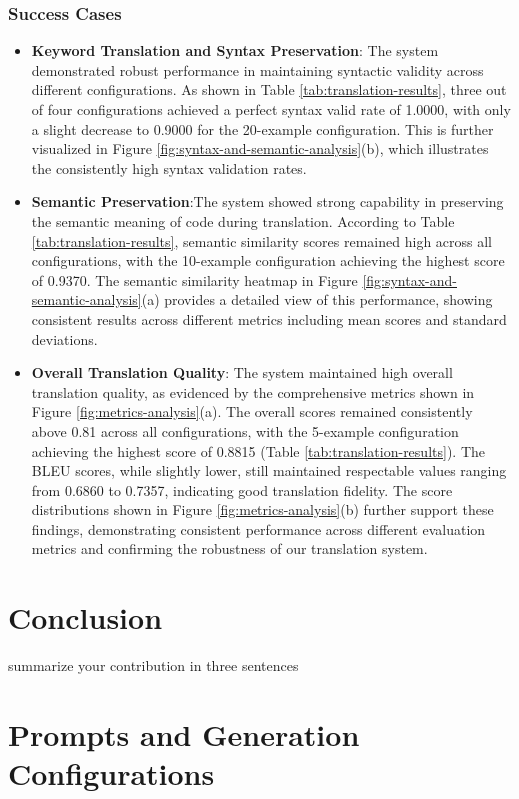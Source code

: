 \documentclass[11pt,a4paper]{article}
\begin{document}
\subsubsection{Success Cases}
\begin{itemize}[itemsep=0pt, topsep=0pt]
    \item \textbf{Keyword Translation and Syntax Preservation}: The system demonstrated robust performance in maintaining syntactic validity across different configurations. As shown in Table \ref{tab:translation-results}, three out of four configurations achieved a perfect syntax valid rate of 1.0000, with only a slight decrease to 0.9000 for the 20-example configuration. This is further visualized in Figure \ref{fig:syntax-and-semantic-analysis}(b), which illustrates the consistently high syntax validation rates.
    \item \textbf{Semantic Preservation}:The system showed strong capability in preserving the semantic meaning of code during translation. According to Table \ref{tab:translation-results}, semantic similarity scores remained high across all configurations, with the 10-example configuration achieving the highest score of 0.9370. The semantic similarity heatmap in Figure \ref{fig:syntax-and-semantic-analysis}(a) provides a detailed view of this performance, showing consistent results across different metrics including mean scores and standard deviations.
    \item \textbf{Overall Translation Quality}: The system maintained high overall translation quality, as evidenced by the comprehensive metrics shown in Figure \ref{fig:metrics-analysis}(a). The overall scores remained consistently above 0.81 across all configurations, with the 5-example configuration achieving the highest score of 0.8815 (Table \ref{tab:translation-results}). The BLEU scores, while slightly lower, still maintained respectable values ranging from 0.6860 to 0.7357, indicating good translation fidelity.
    The score distributions shown in Figure \ref{fig:metrics-analysis}(b) further support these findings, demonstrating consistent performance across different evaluation metrics and confirming the robustness of our translation system.
\end{itemize}

\section{Conclusion}
summarize your contribution in three sentences
\appendix
\label{sec:appendix}
\section{Prompts and Generation Configurations}
\end{document}
